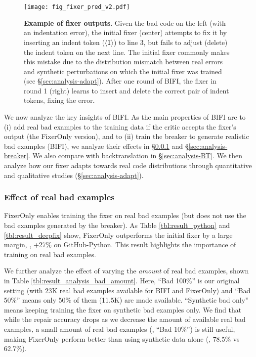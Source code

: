 \begin{figure}[!t]
\hspace{-2mm}
    \texttt{[image: fig\_fixer\_pred\_v2.pdf]}\vspace{-7mm}
    \caption{
    \textbf{Example of fixer outputs}. Given the bad code on the left (with an indentation error), the initial fixer (center) attempts to fix it by inserting an indent token (\texttt{$\langle$I$\rangle$}) to line 3, but fails to adjust (delete) the indent token on the next line. The initial fixer commonly makes this mistake due to the distribution mismatch between real errors and synthetic perturbations on which the initial fixer was trained (see \S \ref{sec:analysis-adapt}). After one round of BIFI, the fixer in round 1 (right) learns to insert and delete the correct pair of indent tokens, fixing the error.
    } \vspace{-2mm}
  \label{fig:fixer_pred}
\end{figure}



We now analyze the key insights of BIFI. As the main properties of BIFI are to (i) add real bad examples to the training data if the critic accepts the fixer's output (the FixerOnly version), and to (ii) train the breaker to generate realistic bad examples (BIFI), we analyze their effects in \S \ref{sec:analysis-realbad} and \S \ref{sec:analysis-breaker}.
We also compare with backtranslation in \S \ref{sec:analysis-BT}.
We then analyze how our fixer adapts towards real code distributions through quantitative and qualitative studies (\S \ref{sec:analysis-adapt}).



\subsubsection{Effect of real bad examples}
\label{sec:analysis-realbad}

FixerOnly enables training the fixer on real bad examples (but does not use the bad examples generated by the breaker). As Table \ref{tbl:result_python} and \ref{tbl:result_deepfix} show, FixerOnly outperforms the initial fixer by a large margin, \eg, +27\% on GitHub-Python.
This result highlights the importance of training on real bad examples.


We further analyze the effect of varying the \textit{amount} of real bad examples, shown in Table \ref{tbl:result_analysis_bad_amount}. Here, ``Bad 100\%'' is our original setting (with 23K real bad examples available for BIFI and FixerOnly) and ``Bad 50\%'' means only 50\% of them (11.5K) are made available. ``Synthetic bad only'' means keeping training the fixer on synthetic bad examples only. We find that while the repair accuracy drops as we decrease the amount of available real bad examples, a small amount of real bad examples (\eg, ``Bad 10\%'') is still useful, making FixerOnly perform better than using synthetic data alone (\ie, 78.5\% vs 62.7\%).



